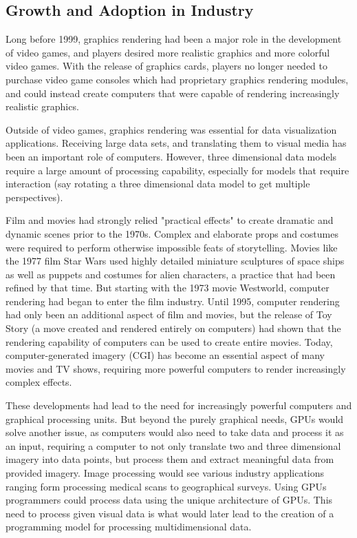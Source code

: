 \documentclass[11pt]{report}
\begin{document}
    \subsection{Growth and Adoption in Industry}
    Long before 1999, graphics rendering had been a major role in the development of video games, and players desired more realistic graphics and more colorful video games. With the release of graphics cards, players no longer needed to purchase video game consoles which had proprietary graphics rendering modules, and could instead create computers that were capable of rendering increasingly realistic graphics.

    Outside of video games, graphics rendering was essential for data visualization applications. Receiving large data sets, and translating them to visual media has been an important role of computers. However, three dimensional data models require a large amount of processing capability, especially for models that require interaction (say rotating a three dimensional data model to get multiple perspectives).

   Film and movies had strongly relied "practical effects" to create dramatic and dynamic scenes prior to the 1970s. Complex and elaborate props and costumes were required to perform otherwise impossible feats of storytelling. Movies like the 1977 film Star Wars used highly detailed miniature sculptures of space ships as well as puppets and costumes for alien characters\cite{STAR_WARS}, a practice that had been refined by that time. But starting with the 1973 movie Westworld, computer rendering had began to enter the film industry. Until 1995, computer rendering had only been an additional aspect of film and movies, but the release of Toy Story (a move created and rendered entirely on computers) had shown that the rendering capability of computers can be used to create entire movies. Today, computer-generated imagery (CGI) has become an essential aspect of many movies and TV shows, requiring more powerful computers to render increasingly complex effects\cite{MOVIES_CGI}.

   These developments had lead to the need for increasingly powerful computers and graphical processing units. But beyond the purely graphical needs, GPUs would solve another issue, as computers would also need to take data and process it as an input, requiring a computer to not only translate two and three dimensional imagery into data points, but process them and extract meaningful data from provided imagery. Image processing would see various industry applications ranging form processing medical scans to geographical surveys. Using GPUs programmers could process data using the unique architecture of GPUs. This need to process given visual data is what would later lead to the creation of a programming model for processing multidimensional data.
\end{document}
